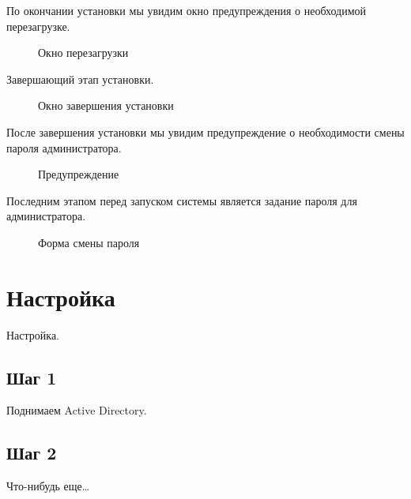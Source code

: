 \clearpage
По окончании установки мы увидим окно предупреждения о необходимой перезагрузке.
\begin{figure}[H]
\caption{Окно перезагрузки}
\label{fig1}
\end{figure}
\clearpage
Завершающий этап установки.
\begin{figure}[H]
\caption{Окно завершения установки}
\label{fig1}
\end{figure}
\clearpage
После завершения установки мы увидим предупреждение о необходимости смены пароля администратора.
\begin{figure}[H]
\caption{Предупреждение}
\label{fig1}
\end{figure}
\clearpage
Последним этапом перед запуском системы является задание пароля для администратора.
\begin{figure}[H]
\caption{Форма смены пароля}
\label{fig1}
\end{figure}

\section{Настройка}
Настройка.

\subsection{Шаг 1}
Поднимаем Active Directory.

\subsection{Шаг 2}
Что-нибудь еще\ldots